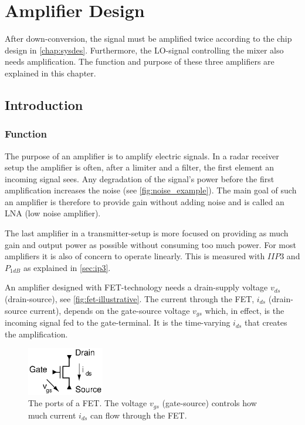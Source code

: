 \chapter{Amplifier Design}\label{ch:amp}

	After down-conversion, the signal must be amplified twice according to the chip design in \autoref{chap:sysdes}. Furthermore, the LO-signal controlling the mixer also needs amplification. The function and purpose of these three amplifiers are explained in this chapter.

	\section{Introduction}
		\subsection{Function}
			The purpose of an amplifier is to amplify electric signals. In a radar receiver setup the amplifier is often, after a limiter and a filter, the first element an incoming signal sees. Any degradation of the signal's power before the first amplification increases the noise (see \autoref{fig:noise_example}). The main goal of such an amplifier is therefore to provide gain without adding noise and is called an LNA (low noise amplifier).

			The last amplifier in a transmitter-setup is more focused on providing as much gain and output power as possible without consuming too much power. For most amplifiers it is also of concern to operate linearly. This is measured with $IIP3$ and $P_{1dB}$ as explained in \autoref{sec:ip3}.

			An amplifier designed with FET-technology needs a drain-supply voltage $v_{ds}$ (drain-source), see \autoref{fig:fet-illustrative}. The current through the FET, $i_{ds}$ (drain-source current), depends on the gate-source voltage $v_{gs}$ which, in effect, is the incoming signal fed to the gate-terminal. It is the time-varying $i_{ds}$ that creates the amplification.

		\begin{figure}[hbt!]
			\centering
			\includegraphics[width=0.3\textwidth]{fig/amplifiers/fet-illustrative}
			\caption[The ports of a FET.]{The ports of a FET. The voltage $v_{gs}$ (gate-source) controls how much current $i_{ds}$ can flow through the FET.}\label{fig:fet-illustrative}
		\end{figure}

